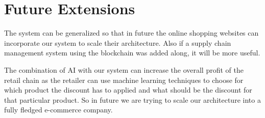 \section{Future Extensions}
\par
The system can be generalized so that in future the online shopping websites can incorporate our system to scale their architecture. Also if a supply chain management system using the blockchain was added along, it will be more useful.
\par The combination of AI with our system can increase the overall profit of the retail chain as the retailer can use machine learning techniques to choose for which product the discount has to applied and what should be the discount for that particular product. So in future we are trying to scale our architecture into a fully fledged e-commerce company.

